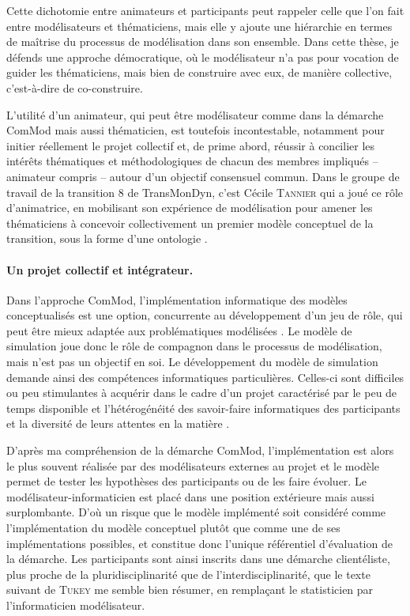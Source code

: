 Cette dichotomie entre \og animateurs\fg{} et \og participants\fg{} peut rappeler celle que l'on fait entre \og modélisateurs\fg{} et \og thématiciens\fg{}, mais elle y ajoute une hiérarchie en termes de maîtrise du processus de modélisation dans son ensemble.
Dans cette thèse, je défends une approche \og démocratique\fg{}, où le modélisateur n'a pas pour vocation de guider les thématiciens, mais bien de construire avec eux, de manière collective, c'est-à-dire de co-construire.

L'utilité d'un \og animateur\fg{}, qui peut être modélisateur comme dans la démarche ComMod mais aussi thématicien, est toutefois incontestable, notamment pour initier réellement le projet collectif et, de prime abord, réussir à concilier les intérêts thématiques et méthodologiques de chacun des membres impliqués -- animateur compris -- autour d'un objectif consensuel commun.
Dans le groupe de travail de la \og transition 8\fg{} de TransMonDyn, c'est Cécile \textsc{Tannier} qui a joué ce rôle d'animatrice, en mobilisant son expérience de modélisation pour amener les thématiciens à concevoir collectivement un premier modèle conceptuel de la transition, sous la forme d'une ontologie \autocite{tannier_ontologie_2014}.

\paragraph{Un projet collectif et intégrateur.}

Dans l'approche ComMod, l'implémentation informatique des modèles conceptualisés est une option, concurrente au développement d'un jeu de rôle, qui peut être mieux adaptée aux problématiques modélisées \autocite[96-97]{etienne_modelisation_2015}.
Le modèle de simulation joue donc le rôle de compagnon dans le processus de modélisation, mais n'est pas un objectif en soi.
Le développement du modèle de simulation demande ainsi des compétences informatiques particulières.
Celles-ci sont difficiles ou peu stimulantes à acquérir dans le cadre d'un projet caractérisé par le \og peu de temps disponible et l'hétérogénéité des savoir-faire informatiques des participants et la diversité de leurs attentes en la matière\fg{} \autocite[29]{etienne_modelisation_2015}.

D'après ma compréhension de la démarche ComMod, l'implémentation est alors le plus souvent réalisée par des modélisateurs externes au projet et le modèle permet de tester les hypothèses des participants ou de les faire évoluer.
Le modélisateur-informaticien est placé dans une position extérieure mais aussi surplombante.
D'où un risque que le modèle implémenté soit considéré comme \og l'implémentation\fg{} du modèle conceptuel plutôt que comme une de ses implémentations possibles, et constitue donc l'unique référentiel d'évaluation de la démarche.
Les participants sont ainsi inscrits dans une démarche clientéliste, plus proche de la pluridisciplinarité que de l'interdisciplinarité, que le texte suivant de \textsc{Tukey} me semble bien résumer, en remplaçant le \og statisticien\fg{} par l'\og{}informaticien modélisateur\fg{}.

